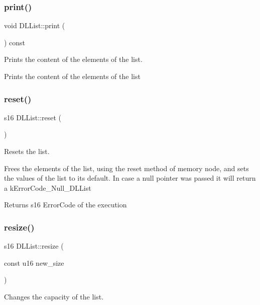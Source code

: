 \subsubsection{\texorpdfstring{print()}{print()}}
{\footnotesize\ttfamily void D\+L\+List\+::print (\begin{DoxyParamCaption}{ }\end{DoxyParamCaption}) const}



Prints the content of the elements of the list. 

Prints the content of the elements of the list \mbox{\label{class_d_l_list_a444881340bdf15cb453bc1b2e61246bf}} 
\subsubsection{\texorpdfstring{reset()}{reset()}}
{\footnotesize\ttfamily s16 D\+L\+List\+::reset (\begin{DoxyParamCaption}{ }\end{DoxyParamCaption})}



Resets the list. 

Frees the elements of the list, using the reset method of memory node, and sets the values of the list to it\textquotesingle{}s default. In case a null pointer was passed it will return a k\+Error\+Code\+\_\+\+Null\+\_\+\+D\+L\+List

\begin{DoxyReturn}{Returns}
s16 Error\+Code of the execution 
\end{DoxyReturn}
\mbox{\label{class_d_l_list_aa22c2c0ef5d27e8a0870e9b86efed78e}} 
\subsubsection{\texorpdfstring{resize()}{resize()}}
{\footnotesize\ttfamily s16 D\+L\+List\+::resize (\begin{DoxyParamCaption}\item[{const u16}]{new\+\_\+size }\end{DoxyParamCaption})}



Changes the capacity of the list. 

